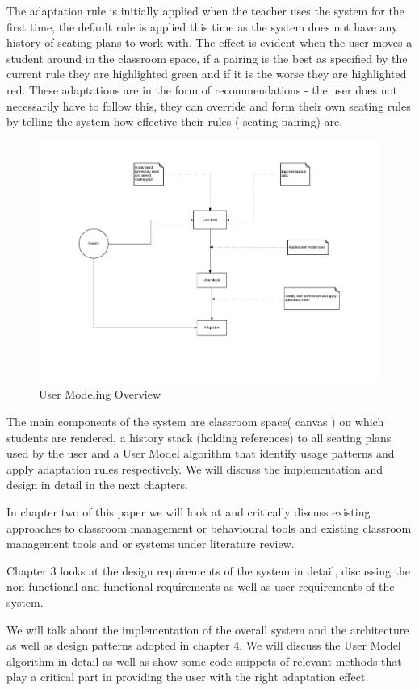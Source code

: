 The adaptation rule is initially applied when the teacher uses the system for the first time, the default rule is applied this time as the system does not have any history of seating plans to work with. The effect is evident when the user moves a student around in the classroom space, if a pairing is the best as specified by the current rule they are highlighted green and if it is the worse they are highlighted red. These adaptations are in the form of recommendations - the user does not necessarily have to follow this, they can override and form their own seating rules by telling the system how effective their rules ( seating pairing) are.


\begin{figure}[!ht]
\caption{User Modeling Overview}
    \label{fig:User-Model}
    \centering
    \includegraphics[scale=0.5]{figures/UM_Overview}
\end{figure}

The main components of the system are classroom space( canvas ) on which students are rendered, a history stack (holding references) to all seating plans used by the user and a User Model algorithm that identify usage patterns and apply adaptation rules respectively. We will discuss the implementation and design in detail in the next chapters.

In chapter two of this paper we will look at and critically discuss existing approaches to classroom management or behavioural tools and existing classroom management tools and or systems under literature review.

Chapter 3 looks at the design requirements of the system in detail, discussing the non-functional and functional requirements as well as user requirements of the system.

We will talk about the implementation of the overall system and the architecture as well as design patterns adopted in chapter 4. We will discuss the User Model algorithm in detail as well as show some code snippets of relevant methods that play a critical part in providing the user with the right adaptation effect.

